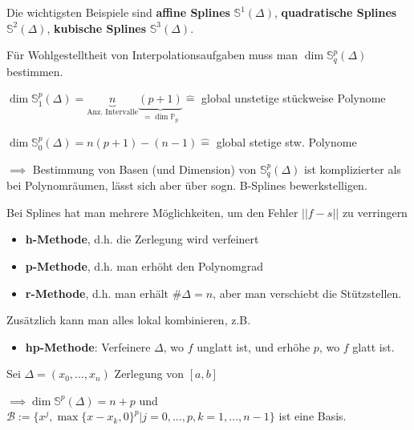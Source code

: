 \begin{remark}
	Die wichtigsten Beispiele sind \textbf{affine Splines} $\mathbb{S}^1(\Delta)$, \textbf{quadratische Splines} $\mathbb{S}^2(\Delta)$, \textbf{kubische Splines} $\mathbb{S}^3(\Delta)$.
\end{remark}

\begin{remark}
	Für Wohlgestelltheit von Interpolationsaufgaben muss man $\dim \mathbb{S}_q^p(\Delta)$ bestimmen.
\end{remark}

\begin{example}
	$\dim \mathbb{S}_1^p(\Delta) = \underbrace{n}_{\text{Anz. Intervalle}}\underbrace{(p+1)}_{=\dim \mathbb{P}_p} \widehat{=}$ global unstetige stückweise Polynome
	
	$\dim \mathbb{S}_0^p(\Delta) = n(p+1) - (n-1) \widehat{=}$ global stetige stw. Polynome
\end{example}

$\implies$ Bestimmung von Basen (und Dimension) von $\mathbb{S}_q^p(\Delta)$ ist komplizierter als bei Polynomräumen, lässt sich aber über sogn. B-Splines bewerkstelligen.

\begin{remark}
	Bei Splines hat man mehrere Möglichkeiten, um den Fehler $||f-s||$ zu verringern
	\begin{itemize}
		\item \textbf{h-Methode}, d.h. die Zerlegung wird verfeinert
		\item \textbf{p-Methode}, d.h. man erhöht den Polynomgrad
		\item \textbf{r-Methode}, d.h. man erhält $\#\Delta=n$, aber man verschiebt die Stützstellen.
	\end{itemize}
	Zusätzlich kann man alles lokal kombinieren, z.B.
	\begin{itemize}
		\item \textbf{hp-Methode}: Verfeinere $\Delta$, wo $f$ unglatt ist, und erhöhe $p$, wo $f$ glatt ist.
	\end{itemize}
\end{remark}

\begin{theorem}
	Sei $\Delta = (x_0, ..., x_n)$ Zerlegung von $[a,b]$
	
	$\implies \dim \mathbb{S}^p(\Delta) = n+p$ und $\mathcal{B}:=\{x^j, \max\{x-x_k, 0\}^p | j=0, ..., p, k=1, ..., n-1\}$ ist eine Basis.
\end{theorem}


